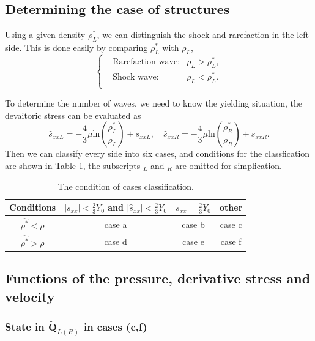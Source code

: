 \documentclass[review]{elsarticle}
\begin{document}
\subsection{Determining the case of structures} \label{sec:deter}

Using a given density $\rho^*_L$, we can distinguish the shock and rarefaction in the left side.  This is done easily by comparing $\rho^*_L$ with $\rho_L$,
\begin{equation}
  \left\{
  \begin{aligned}
	& \text{Rarefaction wave:} & \rho_L > \rho_L^*,\\
	& \text{Shock wave:} &  \rho_L < \rho_L^*.\\
\end{aligned}\right.
\end{equation}

To determine the number of waves, we need to know the yielding situation,  
the devaitoric stress can be evaluated as 
\begin{equation}  \label{sxx1}
  \hat{s}_{xxL}=-\frac{4}{3}\mu\text{ln}(\frac{\rho_L^*}{\rho_L})+s_{xxL},
\quad
  \hat{s}_{xxR}=-\frac{4}{3}\mu\text{ln}(\frac{\rho_R^*}{\rho_R})+s_{xxR}.
\end{equation}
  Then we can classify every side into six cases, and conditions for the classfication are  shown in Table \ref{tab:cases}, the  subscripts $_L$ and  $_R$  are omitted for simplication. 

\begin{table}
  \centering 
  \caption{The condition of  cases classification.}
  \begin{tabular}{c|ccc}
	\toprule
	Conditions & $|s_{xx}|<\frac{2}{3}Y_0$ and $|\hat{s}_{xx}|<\frac{2}{3}Y_0$ & $s_{xx}=\frac{2}{3}Y_0$&  other\\
  \midrule
  $\hat{\rho^*} <\rho$ & case a& case b& case c \\
  $\hat{\rho^*} >\rho$ & case d& case e& case f \\
  \bottomrule
\end{tabular}
\label{tab:cases}
\end{table}

\subsection{Functions of the pressure, derivative stress and velocity}\label{sec:functions}
\subsubsection{State in $\tilde{\mathbf{Q}}_{L(R)}$ in cases (c,f)}
\end{document}
